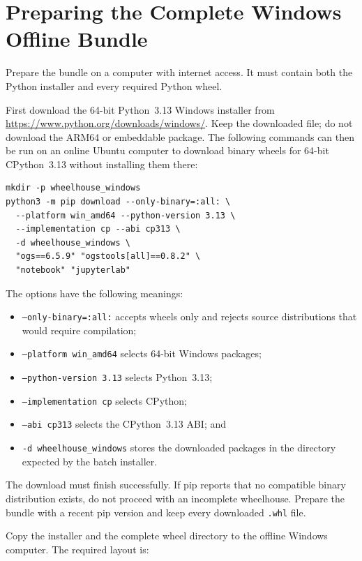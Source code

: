 \documentclass[11pt,a4paper]{tubaf-report}
\begin{document}
\chapter{Preparing the Complete Windows Offline Bundle}
\label{chap:windows-offline-bundle}

Prepare the bundle on a computer with internet access. It must contain both the
Python installer and every required Python wheel.

First download the 64-bit Python~3.13 Windows installer from
\url{https://www.python.org/downloads/windows/}. Keep the downloaded
 file; do not download the ARM64 or embeddable
package. The following commands can then be run on an online Ubuntu computer to
download binary wheels for 64-bit CPython~3.13 without installing them there:

\begin{lstlisting}[style=terminal]
mkdir -p wheelhouse_windows
python3 -m pip download --only-binary=:all: \
  --platform win_amd64 --python-version 3.13 \
  --implementation cp --abi cp313 \
  -d wheelhouse_windows \
  "ogs==6.5.9" "ogstools[all]==0.8.2" \
  "notebook" "jupyterlab"
\end{lstlisting}

The options have the following meanings:

\begin{itemize}
    \item \texttt{--only-binary=:all:} accepts wheels only and rejects source
          distributions that would require compilation;
    \item \texttt{--platform win\_amd64} selects 64-bit Windows packages;
    \item \texttt{--python-version 3.13} selects Python~3.13;
    \item \texttt{--implementation cp} selects CPython;
    \item \texttt{--abi cp313} selects the CPython~3.13 ABI; and
    \item \texttt{-d wheelhouse\_windows} stores the downloaded packages in the
          directory expected by the batch installer.
\end{itemize}

The download must finish successfully. If pip reports that no compatible binary
distribution exists, do not proceed with an incomplete wheelhouse. Prepare the
bundle with a recent pip version and keep every downloaded \texttt{.whl} file.

Copy the installer and the complete wheel directory to the offline Windows
computer. The required layout is:
\end{document}

